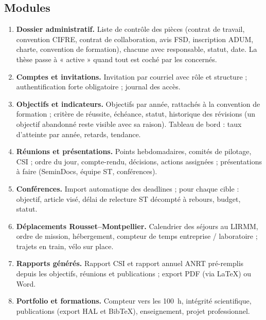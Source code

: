 \documentclass[11pt,a4paper]{article}
\begin{document}
\subsection{Modules}
\begin{enumerate}
  \item \textbf{Dossier administratif.} Liste de contrôle des pièces (contrat de
  travail, convention CIFRE, contrat de collaboration, avis FSD, inscription ADUM,
  charte, convention de formation), chacune avec responsable, statut, date. La thèse
  passe à « active » quand tout est coché par les concernés.
  \item \textbf{Comptes et invitations.} Invitation par courriel avec rôle et
  structure ; authentification forte obligatoire ; journal des accès.
  \item \textbf{Objectifs et indicateurs.} Objectifs par année, rattachés à la
  convention de formation ; critère de réussite, échéance, statut, historique des
  révisions (un objectif abandonné reste visible avec sa raison). Tableau de bord :
  taux d'atteinte par année, retards, tendance.
  \item \textbf{Réunions et présentations.} Points hebdomadaires, comités de pilotage,
  CSI ; ordre du jour, compte-rendu, décisions, actions assignées ; présentations à
  faire (SeminDocs, équipe ST, conférences).
  \item \textbf{Conférences.} Import automatique des deadlines ; pour chaque cible :
  objectif, article visé, délai de relecture ST décompté à rebours, budget, statut.
  \item \textbf{Déplacements Rousset--Montpellier.} Calendrier des séjours au LIRMM,
  ordre de mission, hébergement, compteur de temps entreprise / laboratoire ;
  trajets en train, vélo sur place.
  \item \textbf{Rapports générés.} Rapport CSI et rapport annuel ANRT pré-remplis
  depuis les objectifs, réunions et publications ; export PDF (via LaTeX) ou Word.
  \item \textbf{Portfolio et formations.} Compteur vers les 100~h, intégrité
  scientifique, publications (export HAL et BibTeX), enseignement, projet
  professionnel.
\end{enumerate}
\end{document}
